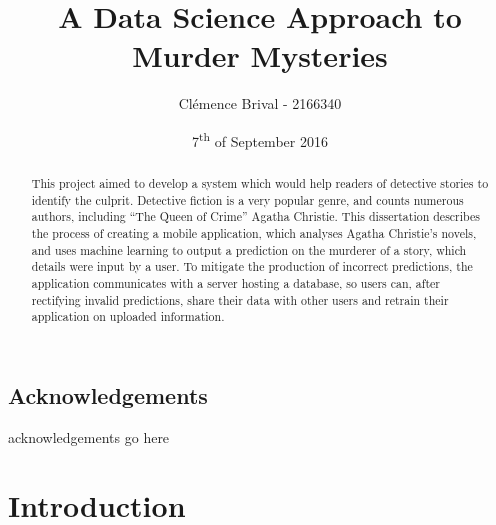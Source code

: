 \documentclass{mproj}
\begin{document}
\title{A Data Science Approach to Murder Mysteries}
\author{Cl\'{e}mence Brival - 2166340}
\date{7\textsuperscript{th} of September 2016}
\maketitle


\begin{abstract}
This project aimed to develop a system which would help readers of detective stories to identify the culprit. Detective fiction is a very popular genre, and counts numerous authors, including ``The Queen of Crime'' Agatha Christie. This dissertation describes the process of creating a mobile application, which analyses Agatha Christie's novels, and uses machine learning to output a prediction on the murderer of a story, which details were input by a user. To mitigate the production of incorrect predictions, the application communicates with a server hosting a database, so users can, after rectifying invalid predictions, share their data with other users and retrain their application on uploaded information.
\end{abstract}

\educationalconsent


\newpage
\section*{Acknowledgements}

acknowledgements go here


\tableofcontents


\chapter{Introduction}\label{intro}
\end{document}
